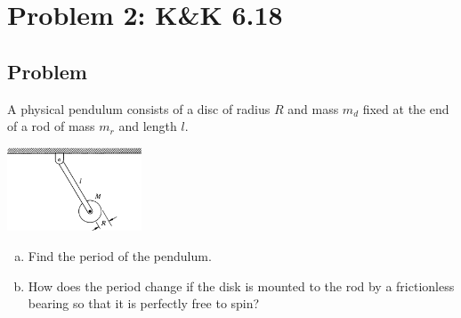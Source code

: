 \documentclass[solutions]{esg8012pset}
\begin{document}
\section*{Problem 2: K\&K 6.18}
\subsection*{Problem}
  A physical pendulum consists of a disc of radius $R$ and mass $m_d$ fixed at the end of a rod of mass $m_r$ and length $l$.
  \begin{center}\includegraphics[width=0.3\textwidth]{ps09_2}\end{center}
  \begin{enumerate}[(a)]
    \item Find the period of the pendulum.
    \item How does the period change if the disk is mounted to the rod by a frictionless bearing so that it is perfectly free to spin?
  \end{enumerate}
\end{document}
